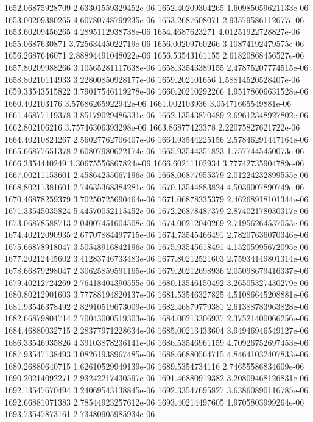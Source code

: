 {1652.06875928709 2.63301559329452e-06
1652.40209304265 1.60985059621133e-06
1653.00209380265 4.60780748799235e-06
1653.2687608071 2.93579586112677e-06
1653.60209456265 4.2895112938738e-06
1654.4687623271 4.01251922728827e-06
1655.0687630871 3.72563445022719e-06
1656.00209760266 3.10874192479575e-06
1656.2687646071 2.88894491048022e-06
1656.53543161155 2.61820868456527e-06
1657.80209988266 3.10565281117638e-06
1658.33543389155 2.47875207774515e-06
1658.80210114933 3.22800850928177e-06
1659.202101656 1.58814520528407e-06
1659.33543515822 3.79017546119278e-06
1660.20210292266 1.95178606631528e-06
1660.402103176 3.57686265922942e-06
1661.002103936 3.05471665549881e-06
1661.46877119378 3.85179029486331e-06
1662.13543870489 2.69612348927802e-06
1662.802106216 3.75746306393298e-06
1663.86877423378 2.22075827621722e-06
1664.40210824267 2.56027762706407e-06
1664.93544225156 2.57846291447164e-06
1665.66877651378 2.60807980622174e-06
1665.93544351823 1.7577445450073e-06
1666.3354440249 1.30675556867824e-06
1666.60211102934 3.77742735904789e-06
1667.00211153601 2.45864255067196e-06
1668.06877955379 2.01224232899555e-06
1668.80211381601 2.74635368384281e-06
1670.13544883824 4.5039007890749e-06
1670.46878259379 3.70250725690464e-06
1671.06878335379 2.46268918101344e-06
1671.33545035824 5.44570052115452e-06
1672.26878487379 2.87402178030317e-06
1673.06878588713 2.04007451604508e-06
1674.00212040269 2.71956264537053e-06
1674.40212090935 2.67707884497715e-06
1674.73545466491 2.78207636070346e-06
1675.66878918047 3.50548916842196e-06
1675.93545618491 4.15205995672095e-06
1677.20212445602 3.41283746733483e-06
1677.80212521603 2.75934149801314e-06
1678.66879298047 2.30625859591165e-06
1679.20212698936 2.05098679416337e-06
1679.40212724269 2.76418404390555e-06
1680.13546150492 3.26505327430279e-06
1680.80212901603 3.77788194820137e-06
1681.53546327825 4.51086645208881e-06
1681.93546378492 2.82910519673009e-06
1682.46879779381 2.61388783963828e-06
1682.66879804714 2.70043000519303e-06
1684.00213306937 2.37521400066256e-06
1684.46880032715 2.28377971228634e-06
1685.00213433604 3.94946946549127e-06
1686.33546935826 4.39103878236141e-06
1686.53546961159 4.70926752697453e-06
1687.93547138493 3.08261938967485e-06
1688.66880564715 4.84641032407833e-06
1689.26880640715 1.62610529949139e-06
1689.5354734116 2.74655586834609e-06
1690.20214092271 2.93242217430597e-06
1691.46880919382 3.20809468126831e-06
1692.13547670494 3.24069543138845e-06
1692.33547695827 3.63860890116785e-06
1692.66881071383 2.78544923257612e-06
1693.40214497605 1.9705803999264e-06
1693.73547873161 2.73480905985934e-06
}
